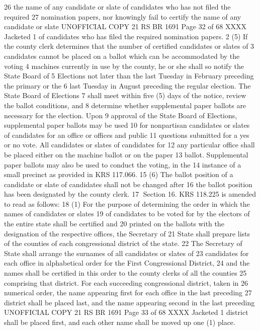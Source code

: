 26 the name of any candidate or slate of candidates who has not filed the required
27 nomination papers, nor knowingly fail to certify the name of any candidate or slate 
UNOFFICIAL COPY 21 RS BR 1691
Page 32 of 68
XXXX Jacketed
1 of candidates who has filed the required nomination papers.
2 (5) If the county clerk determines that the number of certified candidates or slates of
3 candidates cannot be placed on a ballot which can be accommodated by the voting
4 machines currently in use by the county, he or she shall so notify the State Board of
5 Elections not later than the last Tuesday in February preceding the primary or the
6 last Tuesday in August preceding the regular election. The State Board of Elections
7 shall meet within five (5) days of the notice, review the ballot conditions, and
8 determine whether supplemental paper ballots are necessary for the election. Upon
9 approval of the State Board of Elections, supplemental paper ballots may be used
10 for nonpartisan candidates or slates of candidates for an office or offices and public
11 questions submitted for a yes or no vote. All candidates or slates of candidates for
12 any particular office shall be placed either on the machine ballot or on the paper
13 ballot. Supplemental paper ballots may also be used to conduct the voting, in the
14 instance of a small precinct as provided in KRS 117.066.
15 (6) The ballot position of a candidate or slate of candidates shall not be changed after
16 the ballot position has been designated by the county clerk.
17 Section 16. KRS 118.225 is amended to read as follows:
18 (1) For the purpose of determining the order in which the names of candidates or slates
19 of candidates to be voted for by the electors of the entire state shall be certified and
20 printed on the ballots with the designation of the respective offices, the Secretary of
21 State shall prepare lists of the counties of each congressional district of the state.
22 The Secretary of State shall arrange the surnames of all candidates or slates of
23 candidates for each office in alphabetical order for the First Congressional District,
24 and the names shall be certified in this order to the county clerks of all the counties
25 comprising that district. For each succeeding congressional district, taken in
26 numerical order, the name appearing first for each office in the last preceding
27 district shall be placed last, and the name appearing second in the last preceding 
UNOFFICIAL COPY 21 RS BR 1691
Page 33 of 68
XXXX Jacketed
1 district shall be placed first, and each other name shall be moved up one (1) place.
